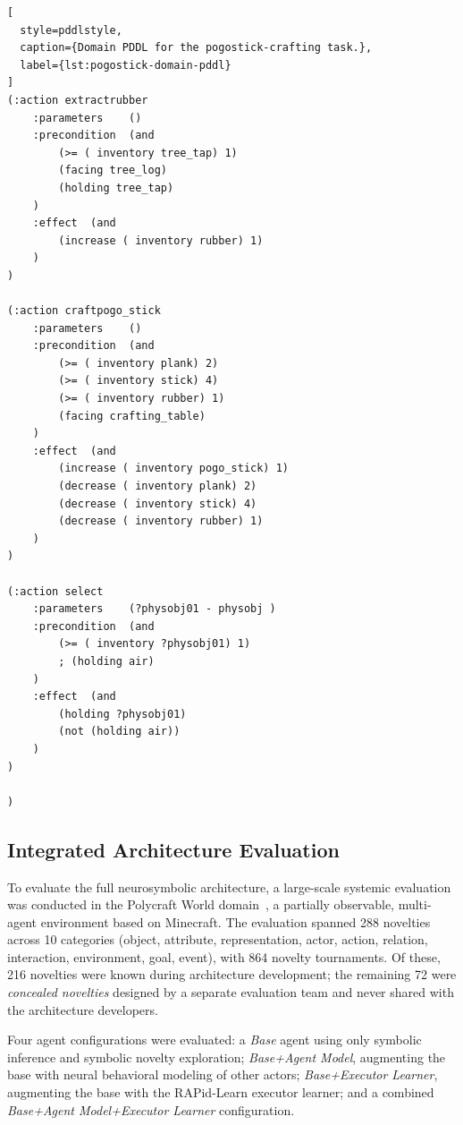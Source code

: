 \begin{lstlisting}[
  style=pddlstyle,
  caption={Domain PDDL for the pogostick-crafting task.},
  label={lst:pogostick-domain-pddl}
]
(:action extractrubber
    :parameters    ()
    :precondition  (and
        (>= ( inventory tree_tap) 1)
        (facing tree_log)
        (holding tree_tap)
    )
    :effect  (and
        (increase ( inventory rubber) 1)
    )
)

(:action craftpogo_stick
    :parameters    ()
    :precondition  (and
        (>= ( inventory plank) 2)
        (>= ( inventory stick) 4)
        (>= ( inventory rubber) 1)
        (facing crafting_table)
    )
    :effect  (and
        (increase ( inventory pogo_stick) 1)
        (decrease ( inventory plank) 2)
        (decrease ( inventory stick) 4)
        (decrease ( inventory rubber) 1)
    )
)

(:action select
    :parameters    (?physobj01 - physobj )
    :precondition  (and
        (>= ( inventory ?physobj01) 1)
        ; (holding air)
    )
    :effect  (and
        (holding ?physobj01)
        (not (holding air))
    )
)

)
\end{lstlisting}

\subsection{Integrated Architecture Evaluation}
\label{sec:rl_eval_architecture}

To evaluate the full neurosymbolic architecture, a large-scale systemic evaluation was conducted in the Polycraft World domain~\citep{goss2023polycraft}, a partially observable, multi-agent environment based on Minecraft. The evaluation spanned 288 novelties across 10 categories (object, attribute, representation, actor, action, relation, interaction, environment, goal, event), with 864 novelty tournaments. Of these, 216 novelties were known during architecture development; the remaining 72 were \emph{concealed novelties} designed by a separate evaluation team and never shared with the architecture developers.

Four agent configurations were evaluated: a \emph{Base} agent using only symbolic inference and symbolic novelty exploration; \emph{Base+Agent Model}, augmenting the base with neural behavioral modeling of other actors; \emph{Base+Executor Learner}, augmenting the base with the RAPid-Learn executor learner; and a combined \emph{Base+Agent Model+Executor Learner} configuration.



